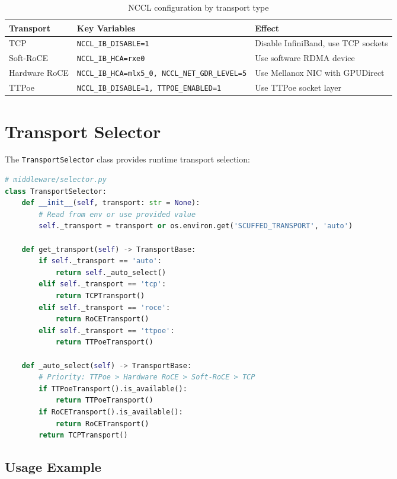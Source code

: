\documentclass[10pt,letterpaper]{article}
\begin{document}
\begin{table}[H]
\centering
\small
\begin{tabular}{@{}llp{6cm}@{}}
\toprule
\textbf{Transport} & \textbf{Key Variables} & \textbf{Effect} \\
\midrule
TCP & \texttt{NCCL\_IB\_DISABLE=1} & Disable InfiniBand, use TCP sockets \\
Soft-RoCE & \texttt{NCCL\_IB\_HCA=rxe0} & Use software RDMA device \\
Hardware RoCE & \texttt{NCCL\_IB\_HCA=mlx5\_0, NCCL\_NET\_GDR\_LEVEL=5} & Use Mellanox NIC with GPUDirect \\
TTPoe & \texttt{NCCL\_IB\_DISABLE=1, TTPOE\_ENABLED=1} & Use TTPoe socket layer \\
\bottomrule
\end{tabular}
\caption{NCCL configuration by transport type}
\end{table}

\section{Transport Selector}

The \texttt{TransportSelector} class provides runtime transport selection:

\begin{lstlisting}[language=Python]
# middleware/selector.py
class TransportSelector:
    def __init__(self, transport: str = None):
        # Read from env or use provided value
        self._transport = transport or os.environ.get('SCUFFED_TRANSPORT', 'auto')

    def get_transport(self) -> TransportBase:
        if self._transport == 'auto':
            return self._auto_select()
        elif self._transport == 'tcp':
            return TCPTransport()
        elif self._transport == 'roce':
            return RoCETransport()
        elif self._transport == 'ttpoe':
            return TTPoeTransport()

    def _auto_select(self) -> TransportBase:
        # Priority: TTPoe > Hardware RoCE > Soft-RoCE > TCP
        if TTPoeTransport().is_available():
            return TTPoeTransport()
        if RoCETransport().is_available():
            return RoCETransport()
        return TCPTransport()
\end{lstlisting}

\subsection{Usage Example}
\end{document}

